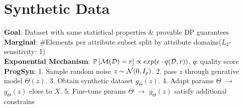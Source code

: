 \section{Synthetic Data}
\textbf{Goal}: Dataset with same statistical properties \& provable DP guarantees\\
\textbf{Marginal}: \#Elements per attribute subset split by attribute domains($L_2$-sensitivity: 1)\\
\textbf{Exponential Mechanism}: $\mathbb{P}\left[\mathcal{M}(\mathcal{D})=r\right] \propto exp(\epsilon\cdot q(\mathcal{D},r))$, $q$: quality score\\
\textbf{ProgSyn}: 1. Sample random noise $z\sim\mathcal{N}(0,I_p)$. 2. pass $z$ through genrative model $\Theta(z)$. 3. Obtain synthetic dataset $g_{\Theta}(z)$. 4. Adapt params $\Theta$ $\rightarrow$ $g_{\Theta}(z)$ close to $X$. 5. Fine-tune params $\Theta$ $\rightarrow$ $g_{\Theta}(z)$ satisfy additional constrains
